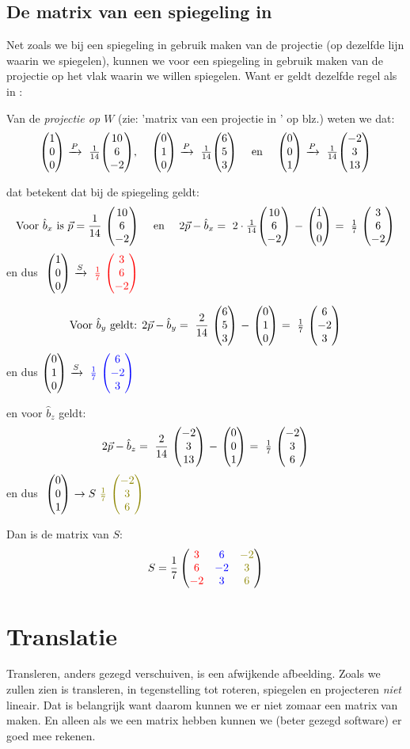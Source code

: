 \subsection{De matrix van een spiegeling in \RD}
Net zoals we bij een spiegeling in \RT gebruik maken van de projectie (op dezelfde lijn waarin we spiegelen), kunnen we voor een spiegeling in \RD gebruik maken van de projectie op het vlak waarin we willen spiegelen. Want er geldt dezelfde regel als in \RT:

Van de \textit{projectie op $W$} (zie: 'matrix van een projectie in \RD' op blz.\pageref{projectieR3}) weten we dat:
\[
    \vecdrie{1}{0}{0} \ \xrightarrow{P}\ \frac{1}{14} \vecdrie{10}{6}{-2} \text{, } \quad 
    \vecdrie{0}{1}{0} \ \xrightarrow{P}\ \frac{1}{14} \vecdrie{6}{5}{3} \quad \text{ en } \quad 
    \vecdrie{0}{0}{1} \ \xrightarrow{P}\ \frac{1}{14} \vecdrie{-2}{3}{13}
\]

dat betekent dat bij de spiegeling geldt:
\[
    \text{Voor } \hat{b}_x \text{ is } \vec{p} = \frac{1}{14}\ \vecdrie{10}{6}{-2} \quad \text{ en } \quad 
    2\vec{p} - \hat{b}_x =\ 2\cdot \frac{1}{14} \vecdrie{10}{6}{-2} \ -\ \vecdrie{1}{0}{0} \ =\ \frac{1}{7}\ \vecdrie{3}{6}{-2} 
\]
en dus $ \ \vecdrie{1}{0}{0}   \  \xrightarrow{S}  \  { \color{red}\frac{1}{7}} \  \vecdrie[red] {3 } {6}{-2} $

\[
    \text{Voor } \hat{b}_y \text{ geldt: } 2\vec{p} - \hat{b}_y =\ \frac{2}{14}\ \vecdrie{6}{5}{3} \ -\ \vecdrie{0}{1}{0} \ 
    =\ \frac{1}{7}\ \vecdrie{6}{-2}{3}
\]
en dus \quad $\vecdrie{0}{1}{0} \ \xrightarrow{S}\ {\color{blue}\frac{1}{7}}\ \vecdrie[blue]{6}{-2}{3} $

en voor $\hat{b}_z$ geldt: 
\[
    2\vec{p} -\hat{b}_z =\ \frac{2}{14}\ \vecdrie{-2}{3}{13} \ -\ \vecdrie{0}{0}{1} \ =\ \frac{1}{7}\ \vecdrie{-2}{3}{6}   
\]
en dus $\ \vecdrie{0}{0}{1} \ \rightarrow{S}\ {\color{olive}\frac{1}{7}} \ \vecdrie[olive]{-2}{3}{6} $

Dan is de matrix van $S$:
\[ 
    S = \frac{1}{7} \matdrie{ \red{3}  & \blu{6}  & \gre{-2} }
                            { \red{6}  & \blu{-2} & \gre{3}  }
                            { \red{-2} & \blu{3}  & \gre{6}  }
\]

\section{Translatie}		
Transleren, anders gezegd verschuiven, is een afwijkende afbeelding. Zoals we zullen zien is transleren, in tegenstelling tot roteren, spiegelen en projecteren \textit{niet} lineair. Dat is belangrijk want daarom kunnen we er niet zomaar een matrix van maken. En alleen als we een matrix hebben kunnen we (beter gezegd software) er  goed mee rekenen. 
